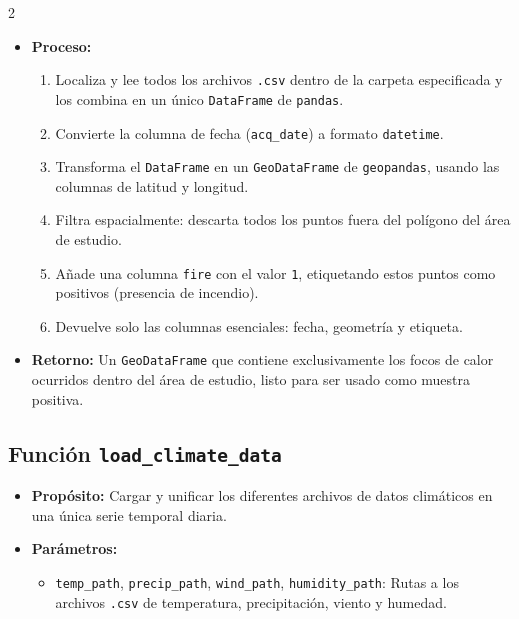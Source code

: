\documentclass[a4paper,10pt]{article}
\begin{document}
\begin{multicols}{2}
\begin{itemize}
    \item \textbf{Proceso:}
    \begin{enumerate}
        \item Localiza y lee todos los archivos \texttt{.csv} dentro de la carpeta especificada y los combina en un único \texttt{DataFrame} de \texttt{pandas}.
        \item Convierte la columna de fecha (\texttt{acq\_date}) a formato \texttt{datetime}.
        \item Transforma el \texttt{DataFrame} en un \texttt{GeoDataFrame} de \texttt{geopandas}, usando las columnas de latitud y longitud.
        \item Filtra espacialmente: descarta todos los puntos fuera del polígono del área de estudio.
        \item Añade una columna \texttt{fire} con el valor \texttt{1}, etiquetando estos puntos como positivos (presencia de incendio).
        \item Devuelve solo las columnas esenciales: fecha, geometría y etiqueta.
    \end{enumerate}

    \item \textbf{Retorno:} Un \texttt{GeoDataFrame} que contiene exclusivamente los focos de calor ocurridos dentro del área de estudio, listo para ser usado como muestra positiva.
\end{itemize}

\subsection{Función \texttt{load\_climate\_data}}

\begin{itemize}
    \item \textbf{Propósito:} Cargar y unificar los diferentes archivos de datos climáticos en una única serie temporal diaria.

    \item \textbf{Parámetros:}
    \begin{itemize}
        \item \texttt{temp\_path}, \texttt{precip\_path}, \texttt{wind\_path}, \texttt{humidity\_path}: Rutas a los archivos \texttt{.csv} de temperatura, precipitación, viento y humedad.
    \end{itemize}


\end{itemize}
\end{multicols}
\end{document}
